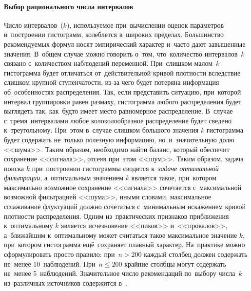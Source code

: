 \documentclass[]{scrartcl}
\begin{document}
\paragraph{Выбор рационального числа интервалов}\label{hist-number-of-k}
\par
Число интервалов~($k$), используемое при~вычислении оценок параметров и~построении гистограмм, колеблется в~широких пределах. Большинство рекомендуемых формул носят эмпирический характер и~часто дают завышенные значения. В~общем случае можно говорить о~том, что~количество интервалов~$k$ связано с~количеством наблюдений переменной. При~слишком малом~$k$ гистограмма будет отличаться от~действительной кривой плотности вследствие слишком крупной ступенчатости, из-за чего будет потеряна информация об~особенностях распределения. Так, если представить ситуацию, при~которой интервал группировки равен размаху, гистограмма любого распределения будет выглядеть так, как~будто имеет место равномерное распределение. В~случае с~тремя~интервалами любое колоколообразное распределение будет сведено к~треугольному. При~этом в~случае слишком большого значения $k$ гистограмма будет содержать не~только полезную информацию, но~и~значительную долю <<шума>>. Таким образом, необходимо найти баланс, который обеспечит сохранение <<сигнала>>, отсеяв при~этом <<шум>>. Таким образом, задача поиска $k$ при~построении гистограммы сводится к~\emph{задаче оптимальной фильтрации}, а~оптимальным значением $k$ является такое, при~котором максимально возможное сохранение <<сигнала>> сочетается с~максимальной возможной фильтрацией <<шума>>, иными словами, максимальное сглаживание флуктуаций должно сочетаться с~минимальным искажением кривой плотности распределения. Одним из~практических признаков приближения к~оптимальному $k$ является исчезновение <<пиков>> и~<<провалов>>, а~ближайшим к~оптимальному может считаться такое максимальное значение $k$, при~котором гистограмма ещё~сохраняет плавный характер. На~практике можно сформулировать просто правило: при~$n > 200$ каждый столбец должен содержать не~менее 10~наблюдений. При~$n \leq 200$ крайние столбцы могут содержать не~менее 5~наблюдений.  Значительное число рекомендаций по~выбору числа~$k$ из~различных источников содержится в~\cite{Nowiczkij:oczenka-pogresh}. 
\end{document}
